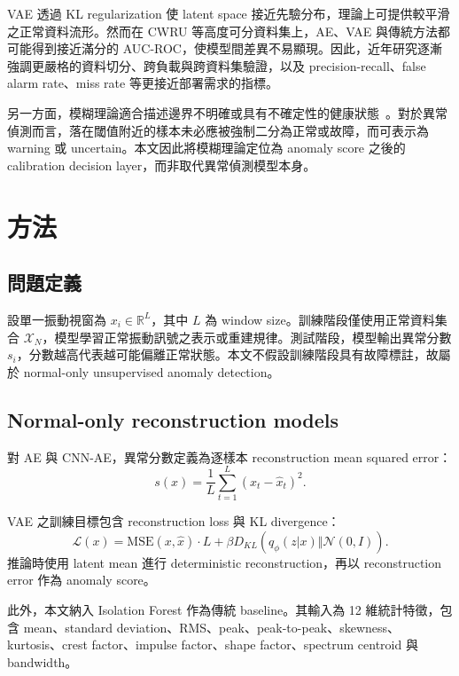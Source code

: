 \documentclass[sn-mathphys-num]{sn-jnl}
\newcommand{\aucroc}{AUC\mbox{-}ROC}
\begin{document}
VAE 透過 KL regularization 使 latent space 接近先驗分布，理論上可提供較平滑之正常資料流形。然而在 CWRU 等高度可分資料集上，AE、VAE 與傳統方法都可能得到接近滿分的 \aucroc{}，使模型間差異不易顯現。因此，近年研究逐漸強調更嚴格的資料切分、跨負載與跨資料集驗證，以及 precision-recall、false alarm rate、miss rate 等更接近部署需求的指標。

另一方面，模糊理論適合描述邊界不明確或具有不確定性的健康狀態~\cite{zadeh1965fuzzy}。對於異常偵測而言，落在閾值附近的樣本未必應被強制二分為正常或故障，而可表示為 warning 或 uncertain。本文因此將模糊理論定位為 anomaly score 之後的 calibration decision layer，而非取代異常偵測模型本身。

\section{方法}
\label{sec:method}

\subsection{問題定義}

設單一振動視窗為 $x_i \in \mathbb{R}^{L}$，其中 $L$ 為 window size。訓練階段僅使用正常資料集合 $\mathcal{X}_{N}$，模型學習正常振動訊號之表示或重建規律。測試階段，模型輸出異常分數 $s_i$，分數越高代表越可能偏離正常狀態。本文不假設訓練階段具有故障標註，故屬於 normal-only unsupervised anomaly detection。

\subsection{Normal-only reconstruction models}

對 AE 與 CNN-AE，異常分數定義為逐樣本 reconstruction mean squared error：
\begin{equation}
s(x) = \frac{1}{L}\sum_{t=1}^{L}(x_t-\hat{x}_t)^2 .
\end{equation}

VAE 之訓練目標包含 reconstruction loss 與 KL divergence：
\begin{equation}
\mathcal{L}(x)=\mathrm{MSE}(x,\hat{x})\cdot L+
\beta D_{KL}(q_{\phi}(z|x)\Vert \mathcal{N}(0,I)).
\end{equation}
推論時使用 latent mean 進行 deterministic reconstruction，再以 reconstruction error 作為 anomaly score。

此外，本文納入 Isolation Forest 作為傳統 baseline。其輸入為 12 維統計特徵，包含 mean、standard deviation、RMS、peak、peak-to-peak、skewness、kurtosis、crest factor、impulse factor、shape factor、spectrum centroid 與 bandwidth。
\end{document}
